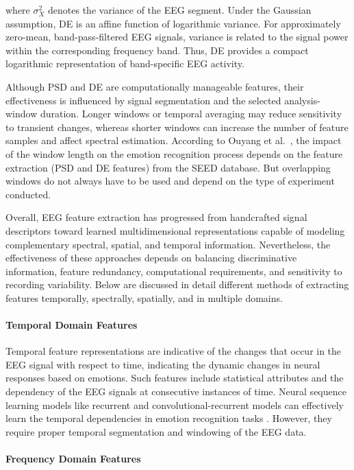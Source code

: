 \documentclass[ASNA,twocolumn]{USG}
\begin{document}
where $\sigma_X^2$ denotes the variance of the EEG segment. Under the Gaussian assumption, DE is an affine function of logarithmic variance. For approximately zero-mean, band-pass-filtered EEG signals, variance is related to the signal power within the corresponding frequency band. Thus, DE provides a compact logarithmic representation of band-specific EEG activity.

Although PSD and DE are computationally manageable features, their effectiveness is influenced by signal segmentation and the selected analysis-window duration. Longer windows or temporal averaging may reduce sensitivity to transient changes, whereas shorter windows can increase the number of feature samples and affect spectral estimation. According to Ouyang et al.~\cite{ouyang2022effect}, the impact of the window length on the emotion recognition process depends on the feature extraction (PSD and DE features) from the SEED database. But overlapping windows do not always have to be used and depend on the type of experiment conducted.

Overall, EEG feature extraction has progressed from handcrafted signal descriptors toward learned multidimensional representations capable of modeling complementary spectral, spatial, and temporal information. Nevertheless, the effectiveness of these approaches depends on balancing discriminative information, feature redundancy, computational requirements, and sensitivity to recording variability. Below are discussed in detail different methods of extracting features temporally, spectrally, spatially, and in multiple domains.

\paragraph{Temporal Domain Features}

Temporal feature representations are indicative of the changes that occur in the EEG signal with respect to time, indicating the dynamic changes in neural responses based on emotions. Such features include statistical attributes and the dependency of the EEG signals at consecutive instances of time. Neural sequence learning models like recurrent and convolutional-recurrent models can effectively learn the temporal dependencies in emotion recognition tasks \cite{shen2020eeg}. However, they require proper temporal segmentation and windowing of the EEG data.

\paragraph{Frequency Domain Features}
\end{document}
